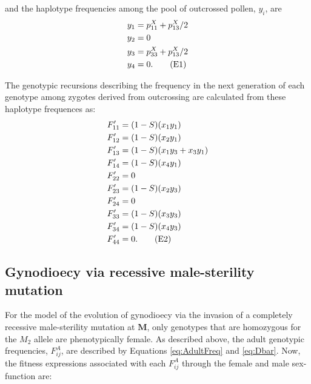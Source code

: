 \documentclass{article}
\newcommand\numberthis{\addtocounter{equation}{1}\tag{\theequation}}
\begin{document}
\noindent and the haplotype frequencies among the pool of outcrossed pollen, $y_i$, are
\begin{align*} 
    y_{1} &= p^X_{11} + p^X_{13}/2  \\
    y_{2} &= 0  \\
    y_{3} &= p^X_{33} + p^X_{13}/2  \\
    y_{4} &= 0.  \numberthis
\end{align*}

\noindent The genotypic recursions describing the frequency in the next generation of each genotype among zygotes derived from outcrossing are calculated from these haplotype frequences as:
\begin{align*} 
     F'_{11} &= (1 - S) (x_1 y_1)  \\
    F'_{12} &= (1 - S) (x_2 y_1)  \\
    F'_{13} &= (1 - S) (x_1 y_3 + x_3 y_1)  \\
    F'_{14} &= (1 - S) (x_4 y_1)  \\
    F'_{22} &= 0 \\
    F'_{23} &= (1 - S) (x_2 y_3)  \\
    F'_{24} &= 0 \\
    F'_{33} &= (1 - S) (x_3 y_3)  \\
    F'_{34} &= (1 - S) (x_4 y_3)  \\
    F'_{44} &= 0. \numberthis
\end{align*}








\newpage{}
\subsection*{Gynodioecy via recessive male-sterility mutation}

For the model of the evolution of gynodioecy via the invasion of a completely recessive male-sterility mutation at $\mathbf{M}$, only genotypes that are homozygous for the $M_2$ allele are phenotypically female. As described above, the adult genotypic frequencies, $F^A_{ij}$, are described by Equations \ref{eq:AdultFreq} and \ref{eq:Dbar}. Now, the fitness expressions associated with each $F^A_{ij}$ through the female and male sex-function are:
\end{document}
